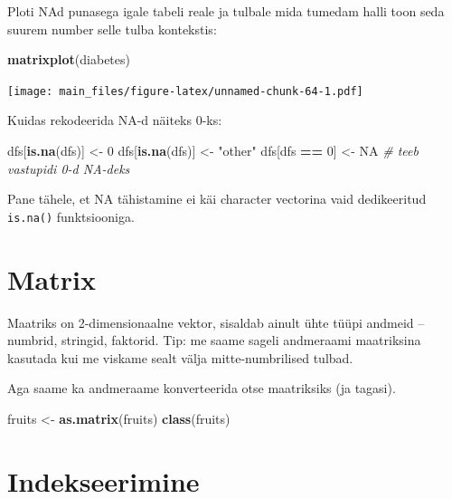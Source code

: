 \documentclass[]{book}
\newenvironment{Shaded}{\begin{snugshade}}{\end{snugshade}}
\newcommand{\KeywordTok}[1]{\textcolor[rgb]{0.13,0.29,0.53}{\textbf{#1}}}
\newcommand{\DecValTok}[1]{\textcolor[rgb]{0.00,0.00,0.81}{#1}}
\newcommand{\StringTok}[1]{\textcolor[rgb]{0.31,0.60,0.02}{#1}}
\newcommand{\CommentTok}[1]{\textcolor[rgb]{0.56,0.35,0.01}{\textit{#1}}}
\newcommand{\OtherTok}[1]{\textcolor[rgb]{0.56,0.35,0.01}{#1}}
\newcommand{\OperatorTok}[1]{\textcolor[rgb]{0.81,0.36,0.00}{\textbf{#1}}}
\newcommand{\NormalTok}[1]{#1}
\begin{document}
Ploti NAd punasega igale tabeli reale ja tulbale mida tumedam halli toon
seda suurem number selle tulba kontekstis:

\begin{Shaded}
\begin{Highlighting}[]
\KeywordTok{matrixplot}\NormalTok{(diabetes) }
\end{Highlighting}
\end{Shaded}

\texttt{[image: main\_files/figure-latex/unnamed-chunk-64-1.pdf]}

Kuidas rekodeerida NA-d näiteks 0-ks:

\begin{Shaded}
\begin{Highlighting}[]
\NormalTok{dfs[}\KeywordTok{is.na}\NormalTok{(dfs)] <-}\StringTok{ }\DecValTok{0}
\NormalTok{dfs[}\KeywordTok{is.na}\NormalTok{(dfs)] <-}\StringTok{ "other"}
\NormalTok{dfs[dfs }\OperatorTok{==}\StringTok{ }\DecValTok{0}\NormalTok{] <-}\StringTok{ }\OtherTok{NA} \CommentTok{# teeb vastupidi 0-d NA-deks}
\end{Highlighting}
\end{Shaded}

Pane tähele, et NA tähistamine ei käi character vectorina vaid
dedikeeritud \texttt{is.na()} funktsiooniga.

\section{Matrix}\label{matrix}

Maatriks on 2-dimensionaalne vektor, sisaldab ainult ühte tüüpi andmeid
-- numbrid, stringid, faktorid. Tip: me saame sageli andmeraami
maatriksina kasutada kui me viskame sealt välja mitte-numbrilised
tulbad.

Aga saame ka andmeraame konverteerida otse maatriksiks (ja tagasi).

\begin{Shaded}
\begin{Highlighting}[]
\NormalTok{fruits <-}\StringTok{ }\KeywordTok{as.matrix}\NormalTok{(fruits)}
\KeywordTok{class}\NormalTok{(fruits)}
\end{Highlighting}
\end{Shaded}

\section{Indekseerimine}\label{indekseerimine}
\end{document}
